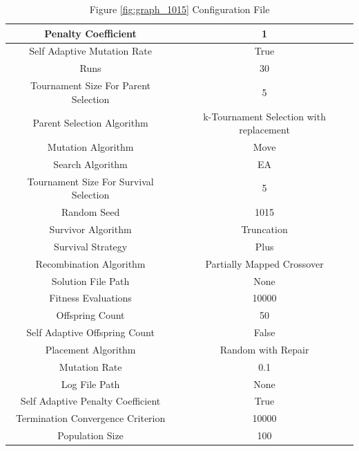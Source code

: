 \documentclass{standalone}
\begin{document}
\begin{table}[!htb]
	\centering
	\caption{Figure \ref{fig:graph_1015} Configuration File}
	\label{tab:graph_1015}
	\begin{tabular}{| c | c |}
		\hline
		Penalty Coefficient		& 1		 \\
		\hline
		Self Adaptive Mutation Rate		& True		 \\
		\hline
		Runs		& 30		 \\
		\hline
		Tournament Size For Parent Selection		& 5		 \\
		\hline
		Parent Selection Algorithm		& k-Tournament Selection with replacement		 \\
		\hline
		Mutation Algorithm		& Move		 \\
		\hline
		Search Algorithm		& EA		 \\
		\hline
		Tournament Size For Survival Selection		& 5		 \\
		\hline
		Random Seed		& 1015		 \\
		\hline
		Survivor Algorithm		& Truncation		 \\
		\hline
		Survival Strategy		& Plus		 \\
		\hline
		Recombination Algorithm		& Partially Mapped Crossover		 \\
		\hline
		Solution File Path		& None		 \\
		\hline
		Fitness Evaluations		& 10000		 \\
		\hline
		Offspring Count		& 50		 \\
		\hline
		Self Adaptive Offspring Count		& False		 \\
		\hline
		Placement Algorithm		& Random with Repair		 \\
		\hline
		Mutation Rate		& 0.1		 \\
		\hline
		Log File Path		& None		 \\
		\hline
		Self Adaptive Penalty Coefficient		& True		 \\
		\hline
		Termination Convergence Criterion		& 10000		 \\
		\hline
		Population Size		& 100		 \\
		\hline
	\end{tabular}
\end{table}
\end{document}
